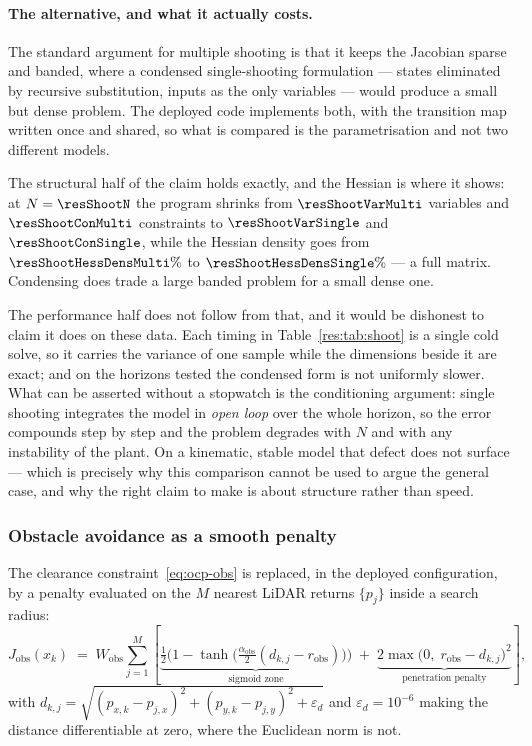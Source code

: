\documentclass[11pt,a4paper]{article}
\newcommand{\Jobs}{J_{\mathrm{obs}}}
\newcommand{\Wobs}{W_{\mathrm{obs}}}
\newcommand{\aobs}{\alpha_{\mathrm{obs}}}
\newcommand{\robs}{r_{\mathrm{obs}}}
\begin{document}
\paragraph{The alternative, and what it actually costs.} The standard argument for multiple shooting is that
it keeps the Jacobian sparse and banded, where a condensed single-shooting formulation --- states eliminated
by recursive substitution, inputs as the only variables --- would produce a small but dense problem. The
deployed code implements both, with the transition map written once and shared, so what is compared is the
parametrisation and not two different models.


The structural half of the claim holds exactly, and the Hessian is where it shows: at $N=\resShootN$ the
program shrinks from $\resShootVarMulti$ variables and $\resShootConMulti$ constraints to
$\resShootVarSingle$ and $\resShootConSingle$, while the Hessian density goes from
$\resShootHessDensMulti\%$ to $\resShootHessDensSingle\%$ --- a full matrix. Condensing does trade a large
banded problem for a small dense one.

The performance half does not follow from that, and it would be dishonest to claim it does on these data.
Each timing in Table~\ref{res:tab:shoot} is a single cold solve, so it carries the variance of one sample
while the dimensions beside it are exact; and on the horizons tested the condensed form is not uniformly
slower. What can be asserted without a stopwatch is the conditioning argument: single shooting integrates the
model in \emph{open loop} over the whole horizon, so the error compounds step by step and the problem
degrades with $N$ and with any instability of the plant. On a kinematic, stable model that defect does not
surface --- which is precisely why this comparison cannot be used to argue the general case, and why the
right claim to make is about structure rather than speed.

\subsubsection{Obstacle avoidance as a smooth penalty}
\label{sec:barrier}

The clearance constraint~\eqref{eq:ocp-obs} is replaced, in the deployed configuration, by a penalty
evaluated on the $M$ nearest LiDAR returns $\{p_j\}$ inside a search radius:
\begin{equation}
  \Jobs(x_k) \;=\; \Wobs\sum_{j=1}^{M}
  \left[\underbrace{\tfrac12\Big(1-\tanh\big(\tfrac{\aobs}{2}(d_{k,j}-\robs)\big)\Big)}_{\text{sigmoid zone}}
  \;+\;\underbrace{2\max\!\big(0,\;\robs-d_{k,j}\big)^2}_{\text{penetration penalty}}\right],
  \label{eq:barrier}
\end{equation}
with $d_{k,j}=\sqrt{(p_{x,k}-p_{j,x})^2+(p_{y,k}-p_{j,y})^2+\varepsilon_d}$ and $\varepsilon_d=10^{-6}$ making
the distance differentiable at zero, where the Euclidean norm is not.
\end{document}
